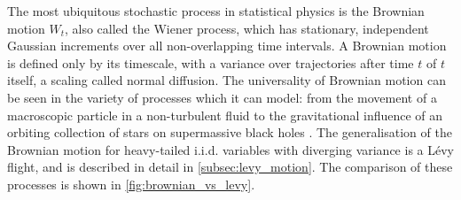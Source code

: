 The most ubiquitous stochastic process in statistical physics is the Brownian motion $W_t$, also called the Wiener process, which has stationary, independent Gaussian increments over all non-overlapping time intervals. A Brownian motion is defined only by its timescale, with a variance over trajectories after time $t$ of $t$ itself, a scaling called normal diffusion. The universality of Brownian motion can be seen in the variety of processes which it can model: from the movement of a macroscopic particle in a non-turbulent fluid \cite{hassler_stochastic_2016} to the gravitational influence of an orbiting collection of stars on supermassive black holes \cite{Chandrasekhar1943, Merritt2007a}. The generalisation of the Brownian motion for heavy-tailed i.i.d. variables with diverging variance is a Lévy flight, and is described in detail in \cref{subsec:levy_motion}. The comparison of these processes is shown in \cref{fig:brownian_vs_levy}.

